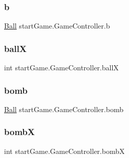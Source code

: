 \subsubsection{\texorpdfstring{b}{b}}
{\footnotesize\ttfamily \hyperlink{classmodel_1_1_ball}{Ball} start\+Game.\+Game\+Controller.\+b\hspace{0.3cm}{\ttfamily [private]}}

\hypertarget{classstart_game_1_1_game_controller_a122256563a1c8df92c4c9d7549f68fd3}{}\label{classstart_game_1_1_game_controller_a122256563a1c8df92c4c9d7549f68fd3} 
\subsubsection{\texorpdfstring{ballX}{ballX}}
{\footnotesize\ttfamily int start\+Game.\+Game\+Controller.\+ballX\hspace{0.3cm}{\ttfamily [private]}}

\hypertarget{classstart_game_1_1_game_controller_a5196356364a188386c9632e2aed1f105}{}\label{classstart_game_1_1_game_controller_a5196356364a188386c9632e2aed1f105} 
\subsubsection{\texorpdfstring{bomb}{bomb}}
{\footnotesize\ttfamily \hyperlink{classmodel_1_1_ball}{Ball} start\+Game.\+Game\+Controller.\+bomb\hspace{0.3cm}{\ttfamily [private]}}

\hypertarget{classstart_game_1_1_game_controller_a9cb60b2c3c52a0c65fcb2480cf52f4e5}{}\label{classstart_game_1_1_game_controller_a9cb60b2c3c52a0c65fcb2480cf52f4e5} 
\subsubsection{\texorpdfstring{bombX}{bombX}}
{\footnotesize\ttfamily int start\+Game.\+Game\+Controller.\+bombX\hspace{0.3cm}{\ttfamily [private]}}

